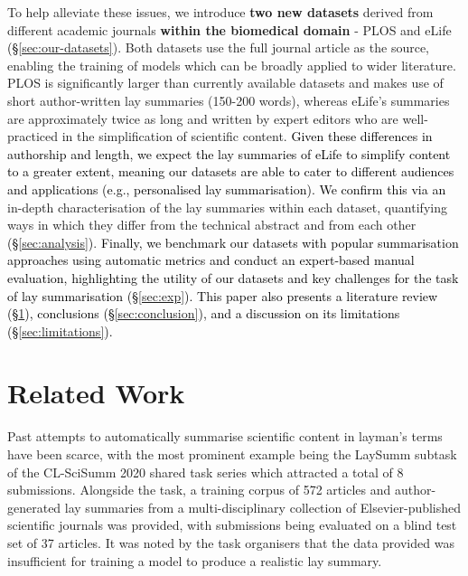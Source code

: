 \documentclass[11pt]{article}
\begin{document}
To help alleviate these issues, we introduce \textbf{two new datasets} derived from different academic journals \textbf{within the biomedical domain} - PLOS and eLife \textcolor{black}{(\S \ref{sec:our-datasets}}).
Both datasets use the full journal article as the source, enabling the training of models which can be broadly applied to wider literature.  
PLOS is significantly larger than currently available datasets and makes use of short author-written lay summaries (150-200 words), whereas eLife's summaries are approximately twice as long and written by expert editors who are well-practiced in the simplification of scientific content. \textcolor{black}{Given these differences in authorship and length, we expect the lay summaries of eLife to simplify content to a greater extent, meaning our datasets are able to cater to different audiences and applications \textcolor{black}{(e.g., personalised lay summarisation)}. We confirm this via an} in-depth characterisation of the lay summaries within each dataset, quantifying ways in which they differ from the technical abstract and from each other \textcolor{black}{(\S \ref{sec:analysis})}.
\textcolor{black}{Finally, we benchmark our datasets with popular summarisation approaches using automatic metrics and conduct an expert-based manual evaluation, highlighting the utility of our datasets and key challenges for the task of lay summarisation} \textcolor{black}{(\S \ref{sec:exp}). This paper also presents a literature review (\S \ref{sec:related}), conclusions (\S \ref{sec:conclusion}), and a discussion on its limitations (\S \ref{sec:limitations}).}
 \section{Related Work}
\label{sec:related}


Past attempts to automatically summarise scientific content in layman's terms have been scarce, with the most prominent example being the LaySumm subtask of the CL-SciSumm 2020 shared task series \citep{Chandrasekaran2020-df} which attracted a total of 8 submissions. Alongside the task, a training corpus of 572 articles and author-generated lay summaries from a multi-disciplinary collection of Elsevier-published scientific journals was provided, with submissions being evaluated on a blind test set of 37 articles. It was noted by the task organisers that the data provided was insufficient for training a model to produce a realistic lay summary.
\end{document}
